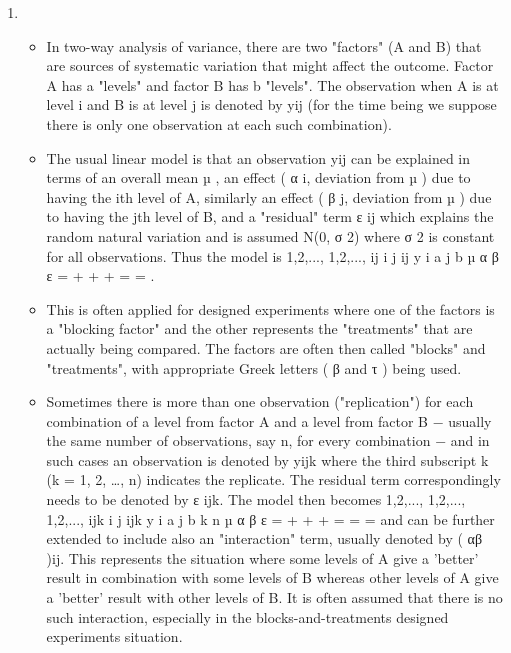 \documentclass[a4paper,12pt]{article}
\begin{document}
\begin{enumerate} 
\item  

\begin{itemize}
\item In two-way analysis of variance, there are two "factors" (A and B) that are sources of systematic variation that might affect the outcome.  Factor A has a "levels" and factor B has b "levels".  The observation when A is at level i and B is at level j is denoted by yij (for the time being we suppose there is only one observation at each such combination).  
\item The usual linear model is that an observation yij can be explained in terms of an overall mean µ , an effect ( α i, deviation from µ ) due to having the ith level of A, similarly an effect ( β j, deviation from µ ) due to having the jth level of B, and a "residual" term ε ij which explains the random natural variation and is assumed N(0, σ 2) where σ 2 is constant for all observations.  Thus the model is 
  1,2,..., 1,2,..., ij i j ij y i a j b µ α β ε = + + + = = . 
 \item This is often applied for designed experiments where one of the factors is a "blocking factor" and the other represents the "treatments" that are actually being compared.  The factors are often then called "blocks" and "treatments", with appropriate Greek letters ( β and τ ) being used. 
 
\item Sometimes there is more than one observation ("replication") for each combination of a level from factor A and a level from factor B  −  usually the same number of observations, say n, for every combination  −  and in such cases an observation is denoted by yijk where the third subscript k (k = 1, 2, …, n) indicates the replicate.  The residual term correspondingly needs to be denoted by ε ijk.  The model then becomes 
  1,2,..., 1,2,..., 1,2,..., ijk i j ijk y i a j b k n µ α β ε = + + + = = = and can be further extended to include also an "interaction" term, usually denoted by ( αβ )ij.  This represents the situation where some levels of A give a 'better' result in combination with some levels of B whereas other levels of A give a 'better' result with other levels of B.  It is often assumed that there is no such interaction, especially in the blocks-and-treatments designed experiments situation. 
\end{itemize} 
 

\end{enumerate}
\end{document}
